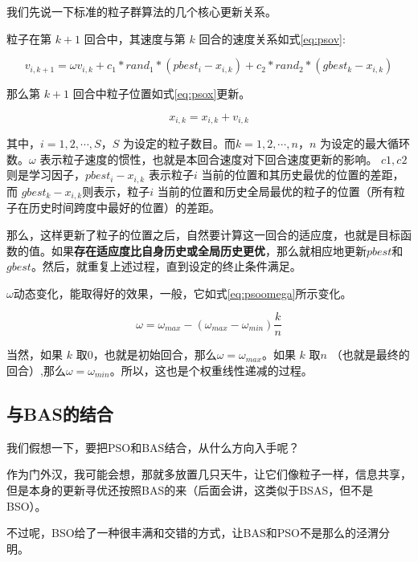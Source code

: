 \documentclass[]{ctexbook}
\begin{document}
我们先说一下标准的粒子群算法的几个核心更新关系。

粒子在第 \(k+1\) 回合中，其速度与第 \(k\)
回合的速度关系如式\eqref{eq:psov}:

\begin{equation}
v_{i,k+1} = \omega v_{i,k} + c_1*rand_1*(pbest_i-x_{i,k})+c_2*rand_2*(gbest_k-x_{i,k})
\label{eq:psov}
\end{equation}

那么第 \(k+1\) 回合中粒子位置如式\eqref{eq:psox}更新。

\begin{equation}
x_{i,k} = x_{i,k} + v_{i,k}
\label{eq:psox}
\end{equation}

其中，\(i=1,2,\cdots,S\)，\(S\)
为设定的粒子数目。而\(k=1,2,\cdots,n\)，\(n\)
为设定的最大循环数。\(\omega\)
表示粒子速度的惯性，也就是本回合速度对下回合速度更新的影响。
\(c1,c2\)则是学习因子，\(pbest_i-x_{i,k}\) 表示粒子\(i\)
当前的位置和其历史最优的位置的差距，而
\(gbest_k-x_{i,k}\)则表示，粒子\(i\)
当前的位置和历史全局最优的粒子的位置（所有粒子在历史时间跨度中最好的位置）的差距。

那么，这样更新了粒子的位置之后，自然要计算这一回合的适应度，也就是目标函数的值。如果\textbf{存在适应度比自身历史或全局历史更优}，那么就相应地更新\(pbest\)和\(gbest\)。然后，就重复上述过程，直到设定的终止条件满足。

\(\omega\)动态变化，能取得好的效果，一般，它如式\eqref{eq:psoomega}所示变化。

\begin{equation}
\omega = \omega_{max} - (\omega_{max}-\omega_{min})\frac{k}{n}
\label{eq:psoomega}
\end{equation}

当然，如果 \(k\)
取0，也就是初始回合，那么\(\omega = \omega_{max}\)。如果 \(k\) 取\(n\)
（也就是最终的回合）,那么\(\omega = \omega_{min}\)。所以，这也是个权重线性递减的过程。

\subsection{与BAS的结合}\label{bas}

我们假想一下，要把PSO和BAS结合，从什么方向入手呢？

作为门外汉，我可能会想，那就多放置几只天牛，让它们像粒子一样，信息共享，但是本身的更新寻优还按照BAS的来（后面会讲，这类似于BSAS，但不是BSO）。

不过呢，BSO给了一种很丰满和交错的方式，让BAS和PSO不是那么的泾渭分明。
\end{document}
